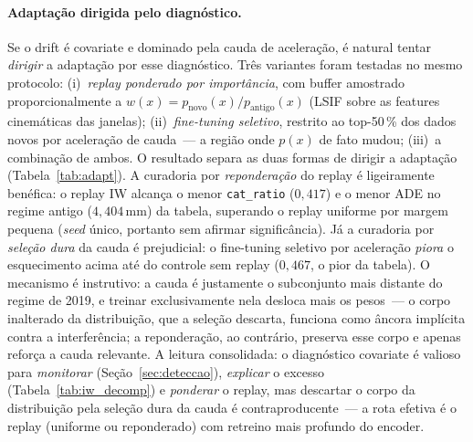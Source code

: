 \documentclass[runningheads]{llncs}
\begin{document}
\paragraph{Adapta\c{c}\~ao dirigida pelo diagn\'ostico.}
Se o drift \'e covariate e dominado pela cauda de acelera\c{c}\~ao, \'e natural tentar \emph{dirigir} a adapta\c{c}\~ao por esse diagn\'ostico. Tr\^es variantes foram testadas no mesmo protocolo: (i)~\emph{replay ponderado por import\^ancia}, com buffer amostrado proporcionalmente a $\hat{w}(x) = p_{\text{novo}}(x)/p_{\text{antigo}}(x)$ (LSIF sobre as features cinem\'aticas das janelas); (ii)~\emph{fine-tuning seletivo}, restrito ao top-50\,\% dos dados novos por acelera\c{c}\~ao de cauda~--- a regi\~ao onde $p(x)$ de fato mudou; (iii)~a combina\c{c}\~ao de ambos. O resultado separa as duas formas de dirigir a adapta\c{c}\~ao (Tabela~\ref{tab:adapt}). A curadoria por \emph{repondera\c{c}\~ao} do replay \'e ligeiramente ben\'efica: o replay IW alcan\c{c}a o menor \texttt{cat\_ratio} ($0{,}417$) e o menor ADE no regime antigo ($4{,}404$\,mm) da tabela, superando o replay uniforme por margem pequena (\emph{seed} \'unico, portanto sem afirmar signific\^ancia). J\'a a curadoria por \emph{sele\c{c}\~ao dura} da cauda \'e prejudicial: o fine-tuning seletivo por acelera\c{c}\~ao \emph{piora} o esquecimento acima at\'e do controle sem replay ($0{,}467$, o pior da tabela). O mecanismo \'e instrutivo: a cauda \'e justamente o subconjunto mais distante do regime de 2019, e treinar exclusivamente nela desloca mais os pesos~--- o corpo inalterado da distribui\c{c}\~ao, que a sele\c{c}\~ao descarta, funciona como \^ancora impl\'icita contra a interfer\^encia; a repondera\c{c}\~ao, ao contr\'ario, preserva esse corpo e apenas refor\c{c}a a cauda relevante. A leitura consolidada: o diagn\'ostico covariate \'e valioso para \emph{monitorar} (Se\c{c}\~ao~\ref{sec:deteccao}), \emph{explicar} o excesso (Tabela~\ref{tab:iw_decomp}) e \emph{ponderar} o replay, mas descartar o corpo da distribui\c{c}\~ao pela sele\c{c}\~ao dura da cauda \'e contraproducente~--- a rota efetiva \'e o replay (uniforme ou reponderado) com retreino mais profundo do encoder.
\end{document}
